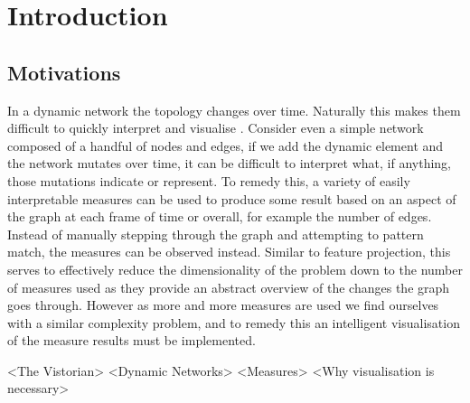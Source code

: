 
\chapter{Introduction}
\label{chap:introduction}
\ifpdf
    \graphicspath{{Introduction/Figures/PNG/}{Introduction/Figures/PDF/}{Introduction/Figures/}}
\else
    \graphicspath{{Introduction/Figures/EPS/}{Introduction/Figures/}}
\fi




\section{Motivations}
\label{motivations}
In a dynamic network the topology changes over time. Naturally this makes them difficult to quickly interpret and visualise \cite{iddps}. Consider even a simple network composed of a handful of nodes and edges, if we add the dynamic element and the network mutates over time,  it can be difficult to interpret what, if anything, those mutations indicate or represent. To remedy this, a variety of easily interpretable measures can be used to produce some result based on an aspect of the graph at each frame of time or overall, for example the number of edges. Instead of manually stepping through the graph and attempting to pattern match, the measures can be observed instead. Similar to feature projection, this serves to effectively reduce the dimensionality \cite{wikidimred} of the problem down to the number of measures used as they provide an abstract overview of the changes the graph goes through. However as more and more measures are used we find ourselves with a similar complexity problem, and to remedy this an intelligent visualisation of the measure results must be implemented.

<The Vistorian>
<Dynamic Networks>
<Measures>
<Why visualisation is necessary>

